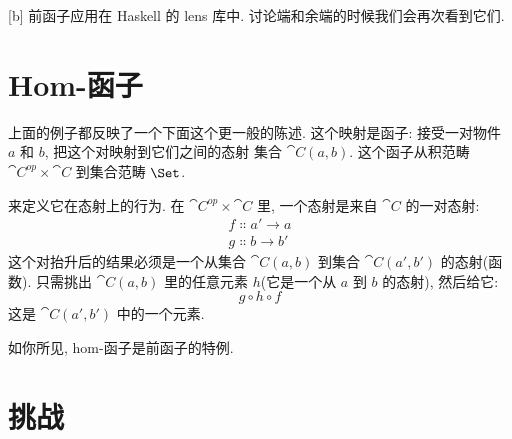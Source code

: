 [b]
前函子应用在 Haskell 的 lens 库中. 讨论端和余端的时候我们会再次看到它们.

\section{Hom-函子}

上面的例子都反映了一个下面这个更一般的陈述. 这个映射是函子: 接受一对物件 $a$ 和 $b$, 把这个对映射到它们之间的态射
集合 $\cat{C}(a, b)$. 这个函子从积范畴 $\cat{C}^{op} \times \cat{C}$ 到集合范畴 $\Set$.

来定义它在态射上的行为. 在 $\cat{C}^{op} \times \cat{C}$ 里, 一个态射是来自 $\cat{C}$ 的一对态射:
\begin{gather*}
  f \Colon a' \to a \\
  g \Colon b \to b'
\end{gather*}
这个对抬升后的结果必须是一个从集合 $\cat{C}(a, b)$ 到集合 $\cat{C}(a', b')$ 的态射(函数). 只需挑出
$\cat{C}(a, b)$ 里的任意元素 $h$(它是一个从 $a$ 到 $b$ 的态射), 然后给它:
\[g \circ h \circ f\]
这是 $\cat{C}(a', b')$ 中的一个元素.

如你所见, hom-函子是前函子的特例.

\section{挑战}

